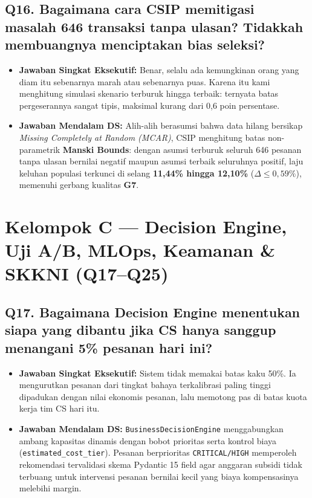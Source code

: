 \documentclass[11pt,a4paper,oneside]{book}
\newcommand{\code}[1]{{\small\nolinkurl{#1}}}
\begin{document}
\subsection*{Q16. Bagaimana cara CSIP memitigasi masalah 646 transaksi tanpa ulasan? Tidakkah membuangnya menciptakan bias seleksi?}
\begin{itemize}
  \item \textbf{Jawaban Singkat Eksekutif:} Benar, selalu ada kemungkinan orang yang diam itu sebenarnya marah atau sebenarnya puas. Karena itu kami menghitung simulasi skenario terburuk hingga terbaik: ternyata batas pergeserannya sangat tipis, maksimal kurang dari 0,6 poin persentase.
  \item \textbf{Jawaban Mendalam DS:} Alih-alih berasumsi bahwa data hilang bersikap \emph{Missing Completely at Random (MCAR)}, CSIP menghitung batas non-parametrik \textbf{Manski Bounds}: dengan asumsi terburuk seluruh 646 pesanan tanpa ulasan bernilai negatif maupun asumsi terbaik seluruhnya positif, laju keluhan populasi terkunci di selang \textbf{11,44\% hingga 12,10\%} ($\Delta \le 0{,}59\%$), memenuhi gerbang kualitas \textbf{G7}.
\end{itemize}

\section{Kelompok C --- Decision Engine, Uji A/B, MLOps, Keamanan \& SKKNI (Q17--Q25)}

\subsection*{Q17. Bagaimana Decision Engine menentukan siapa yang dibantu jika CS hanya sanggup menangani 5\% pesanan hari ini?}
\begin{itemize}
  \item \textbf{Jawaban Singkat Eksekutif:} Sistem tidak memakai batas kaku 50\%. Ia mengurutkan pesanan dari tingkat bahaya terkalibrasi paling tinggi dipadukan dengan nilai ekonomis pesanan, lalu memotong pas di batas kuota kerja tim CS hari itu.
  \item \textbf{Jawaban Mendalam DS:} \code{BusinessDecisionEngine} menggabungkan ambang kapasitas dinamis dengan bobot prioritas serta kontrol biaya (\code{estimated_cost_tier}). Pesanan berprioritas \code{CRITICAL/HIGH} memperoleh rekomendasi tervalidasi skema Pydantic 15 field agar anggaran subsidi tidak terbuang untuk intervensi pesanan bernilai kecil yang biaya kompensasinya melebihi margin.
\end{itemize}
\end{document}
